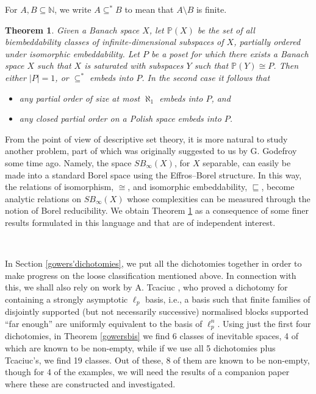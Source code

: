 \documentclass[10pt]{amsart}
\numberwithin{equation}{section}
\newtheorem{thm}{Theorem}[section]
\begin{document}
For $A,B \subseteq {\mathbb N}$, we write $A \subseteq^* B$ to mean that $A \setminus B$
is finite.
\begin{thm}\label{posets}
Given a Banach space $X$, let ${\mathbb P}(X)$ be the set of all
biembeddability classes of infinite-dimensional subspaces of $X$, partially ordered under isomorphic
embeddability. Let $P$ be a poset for which there exists a Banach space $X$ such that
$X$ is saturated with subspaces $Y$ such that ${\mathbb P}(Y){\cong} P$. Then either $|P|=1$, or
$\subseteq^*$ embeds into $P$. In the second case it follows that \begin{itemize}
  \item[(a)] any partial order of size at most $\aleph_1$ embeds into $P$, and
  \item[(b)] any closed partial order on a Polish space embeds into $P$.
\end{itemize}
\end{thm}
From the point of view of descriptive set theory, it is more natural to study
another problem, part of which was originally suggested to us by G. Godefroy
some time ago. Namely, the space $SB_\infty(X)$, for $X$ separable, can easily
be made into a standard Borel space using the Effros--Borel structure. In this
way, the relations of isomorphism, ${\cong}$, and isomorphic embeddability,
$\sqsubseteq$, become analytic relations on $SB_\infty(X)$ whose complexities
can be measured through the notion of Borel reducibility. We obtain Theorem
\ref{posets} as a consequence of some finer results formulated in this language
and that are of independent interest.

\

In Section \ref{gowers'dichotomies}, we put all the dichotomies together in
order to make progress on the loose classification mentioned above. In
connection with this, we shall also rely on work by A. Tcaciuc \cite{T}, who
proved a dichotomy for containing a strongly asymptotic $\ell_p$ basis, i.e., a
basis such that finite families of disjointly supported (but not necessarily
successive) normalised blocks supported ``far enough'' are uniformly equivalent
to the basis of $\ell_p^n$. Using just the first four dichotomies, in Theorem
\ref{gowersbis} we find 6 classes of inevitable spaces, 4 of which are known to
be non-empty, while if we use all 5 dichotomies plus Tcaciuc's, we find 19
classes. Out of these, 8 of them are known to be non-empty, though for 4 of the
examples, we will need the results of a companion paper \cite{exemples} where
these are constructed and investigated.
\end{document}
